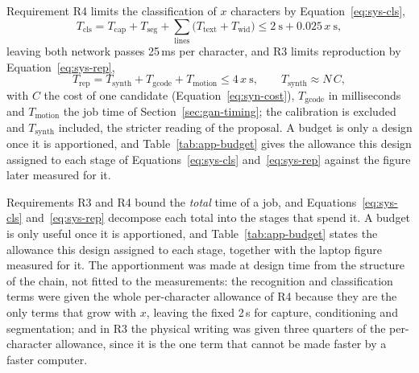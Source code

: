 Requirement R4 limits the classification of $x$ characters by Equation~\ref{eq:sys-cls},
\begin{equation}
T_{\mathrm{cls}}=T_{\mathrm{cap}}+T_{\mathrm{seg}}+\sum_{\mathrm{lines}}\bigl(T_{\mathrm{text}}+T_{\mathrm{wid}}\bigr)\le2\ \mathrm{s}+0.025\,x\ \mathrm{s},
\label{eq:sys-cls}
\end{equation}
leaving both network passes 25\,ms per character, and R3 limits reproduction by Equation~\ref{eq:sys-rep},
\begin{equation}
T_{\mathrm{rep}}=T_{\mathrm{synth}}+T_{\mathrm{gcode}}+T_{\mathrm{motion}}\le4\,x\ \mathrm{s},\qquad T_{\mathrm{synth}}\approx N\,C,
\label{eq:sys-rep}
\end{equation}
with $C$ the cost of one candidate (Equation~\ref{eq:syn-cost}), $T_{\mathrm{gcode}}$ in milliseconds and $T_{\mathrm{motion}}$ the job time of Section~\ref{sec:gan-timing}; the calibration is excluded and $T_{\mathrm{synth}}$ included, the stricter reading of the proposal.
A budget is only a design once it is apportioned, and Table~\ref{tab:app-budget} gives the allowance this design assigned to each stage of Equations~\ref{eq:sys-cls} and~\ref{eq:sys-rep} against the figure later measured for it.

Requirements R3 and R4 bound the \emph{total} time of a job, and Equations~\ref{eq:sys-cls} and~\ref{eq:sys-rep} decompose each total into the stages that spend it.
A budget is only useful once it is apportioned, and Table~\ref{tab:app-budget} states the allowance this design assigned to each stage, together with the laptop figure measured for it.
The apportionment was made at design time from the structure of the chain, not fitted to the measurements: the recognition and classification terms were given the whole per-character allowance of R4 because they are the only terms that grow with $x$, leaving the fixed 2\,s for capture, conditioning and segmentation; and in R3 the physical writing was given three quarters of the per-character allowance, since it is the one term that cannot be made faster by a faster computer.

